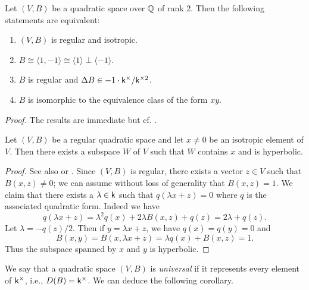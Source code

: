 \begin{theoremx}\label{thm:regular-witt}
    Let \((V, B)\) be a quadratic space over \(\mathbb{Q}\) of rank \(2\). Then the following statements are equivalent:

    \smallskip

    \begin{enumerate}[nosep, label=(\alph*)]
        \item \((V, B)\) is regular and isotropic.
        \item \(B \cong \langle 1, -1 \rangle \cong \langle 1 \rangle \perp \langle -1 \rangle\).
        \item \(B\) is regular and \({\Delta} B \in -1 \cdot \mathsf{k}^{\times}/\mathsf{k}^{\times2}\).
        \item \(B\) is isomorphic to the equivalence class of the form \(xy\).
    \end{enumerate}
\end{theoremx}

\emph{Proof.} The results are immediate but cf. \cite[pp.~12--13]{lam1973quadratic}.

\begin{theoremx}\label{thm:hyperbolic-decomp}
    Let \((V,B)\) be a regular quadratic space and let \(x \neq 0\) be an isotropic element of \(V\). Then there exists a subspace \(W\) of \(V\) such that \(W\) contains \(x\) and is hyperbolic.
\end{theoremx}

\begin{proof}
    See also \cite[p.~13]{clarkquadratic} or \cite[p.~29]{serre2012course}. Since \((V,B)\) is regular, there exists a vector \(z \in V\) such that \(B(x,z) \neq 0\); we can assume without loss of generality that \(B(x,z) = 1\). We claim that there exists a \(\lambda \in \mathsf{k}\) such that \(q(\lambda x + z) = 0\) where \(q\) is the associated quadratic form. Indeed we have
    \[
        q(\lambda x + z) = \lambda^2q(x) + 2\lambda B(x,z) + q(z) = 2\lambda + q(z).     
    \]
    Let \(\lambda = -q(z)/2\). Then if \(y = \lambda x + z\), we have \(q(x) = q(y) = 0\) and
    \[
        B(x,y) = B(x, \lambda x + z) = \lambda q(x) + B(x,z) = 1.
    \]
    Thus the subspace spanned by \(x\) and \(y\) is hyperbolic.
\end{proof}

\medskip


We say that a quadratic space \((V,B)\) is \emph{universal} if it represents every element of \(\mathsf{k}^{\times}\), i.e., \(D(B) = \mathsf{k}^{\times}\).  We can deduce the following corollary.

